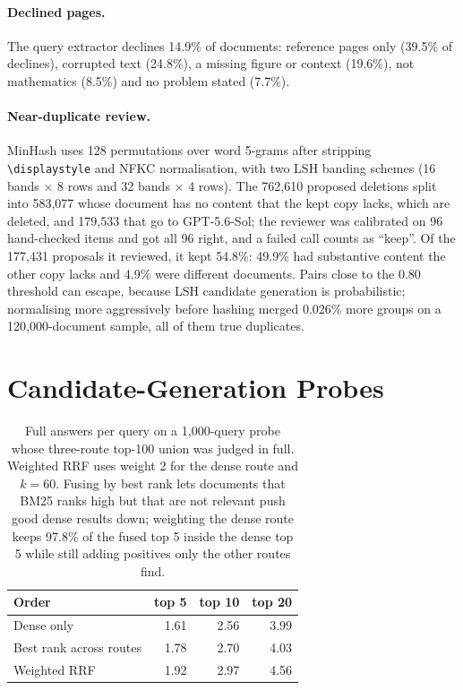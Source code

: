 \paragraph{Declined pages.} The query extractor declines 14.9\% of documents: reference pages only (39.5\% of declines), corrupted text (24.8\%), a missing figure or context (19.6\%), not mathematics (8.5\%) and no problem stated (7.7\%).

\paragraph{Near-duplicate review.} MinHash uses 128 permutations over word 5-grams after stripping \verb|\displaystyle| and NFKC normalisation, with two LSH banding schemes (16 bands $\times$ 8 rows and 32 bands $\times$ 4 rows). The 762,610 proposed deletions split into 583,077 whose document has no content that the kept copy lacks, which are deleted, and 179,533 that go to GPT-5.6-Sol; the reviewer was calibrated on 96 hand-checked items and got all 96 right, and a failed call counts as ``keep''. Of the 177,431 proposals it reviewed, it kept 54.8\%: 49.9\% had substantive content the other copy lacks and 4.9\% were different documents. Pairs close to the 0.80 threshold can escape, because LSH candidate generation is probabilistic; normalising more aggressively before hashing merged 0.026\% more groups on a 120,000-document sample, all of them true duplicates.

\section{Candidate-Generation Probes}
\label{app:probes}

\begin{table}[h]
\centering
\small
\begin{tabular}{lrrr}
\toprule
Order & top 5 & top 10 & top 20 \\
\midrule
Dense only & 1.61 & 2.56 & 3.99 \\
Best rank across routes & 1.78 & 2.70 & 4.03 \\
Weighted RRF & 1.92 & 2.97 & 4.56 \\
\bottomrule
\end{tabular}
\caption{Full answers per query on a 1,000-query probe whose three-route top-100 union was judged in full. Weighted RRF uses weight 2 for the dense route and $k = 60$. Fusing by best rank lets documents that BM25 ranks high but that are not relevant push good dense results down; weighting the dense route keeps 97.8\% of the fused top 5 inside the dense top 5 while still adding positives only the other routes find.}
\label{tab:rrf}
\end{table}

